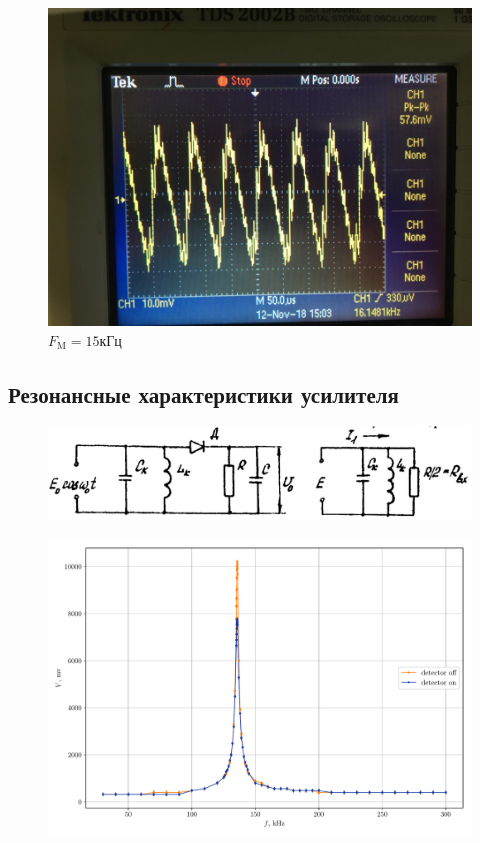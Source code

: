 \begin{figure}[h!]
\begin{minipage}{0.33\linewidth}
		\caption*{$R_2C_2$}
		\caption*{$F_\text{M}=7\text{кГц}$}
	\end{minipage}
	\begin{minipage}{0.33\linewidth}
		\centering
		\includegraphics[width=0.9\linewidth]{photo/15kHztau2.jpg}
		\caption*{$R_2C_2$}
		\caption*{$F_\text{M}=15\text{кГц}$}
	\end{minipage}
\end{figure}
\subsection{Резонансные характеристики усилителя}
 \begin{figure}[h!]
	\centering
	\includegraphics[width=\linewidth]{picture/pic12.jpg}
	\caption{}
	\label{pic:12}
\end{figure}

 \begin{figure}[H]
 	\centering
 	\includegraphics[width=\linewidth]{plots/exp3c.pdf}
 	\caption{}
 	\label{exp:3.4}
 \end{figure}
